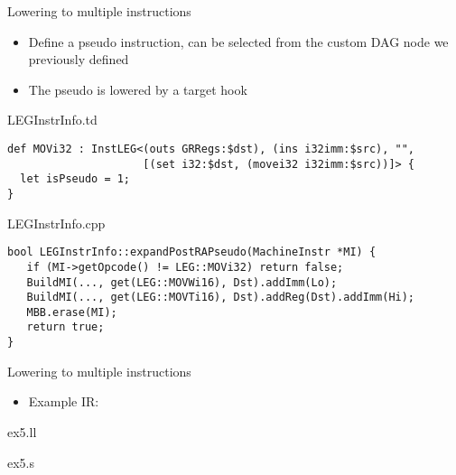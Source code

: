 \begin{frame}[fragile]{Lowering to multiple instructions}

\begin{itemize}
    \item Define a pseudo instruction, can be selected from the custom DAG node we previously defined
    \item The pseudo is lowered by a target hook
\end{itemize}

\begin{block}{LEGInstrInfo.td}
\begin{lstlisting}
def MOVi32 : InstLEG<(outs GRRegs:$dst), (ins i32imm:$src), "",
                     [(set i32:$dst, (movei32 i32imm:$src))]> {
  let isPseudo = 1;
}
\end{lstlisting}
\end{block}

\begin{block}{LEGInstrInfo.cpp}
\begin{lstlisting}
bool LEGInstrInfo::expandPostRAPseudo(MachineInstr *MI) {
   if (MI->getOpcode() != LEG::MOVi32) return false;
   BuildMI(..., get(LEG::MOVWi16), Dst).addImm(Lo);
   BuildMI(..., get(LEG::MOVTi16), Dst).addReg(Dst).addImm(Hi);
   MBB.erase(MI);
   return true;
}
\end{lstlisting}
\end{block}

\end{frame}


\begin{frame}{Lowering to multiple instructions}

\begin{itemize}
    \item Example IR:
\end{itemize}

\begin{block}{ex5.ll}

\end{block}

\begin{block}{ex5.s}

\end{block}

\end{frame}
